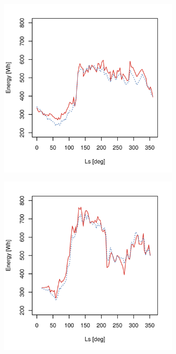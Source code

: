 \begin{figure}[h]
\begin{subfigure}[t]{\subfigureWidth}
		\includegraphics[height=\graphicsHeight]{sections/appendix/energy-error-margin/plots/predicted-vs-measured-energy-my30-adjusted-without-outliers.png}
		\label{fig:plot:sub:mer-energy-production-predicted-vs-reported-my30-adjusted-without-outliers}
	\end{subfigure}\hfill
    \begin{subfigure}[t]{\subfigureWidth}
        \centering
		\includegraphics[height=\graphicsHeight]{sections/appendix/energy-error-margin/plots/predicted-vs-measured-energy-my32-adjusted-without-outliers.png}

\end{subfigure}
\end{figure}
